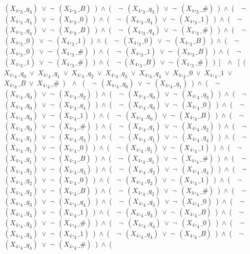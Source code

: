 ﻿\documentclass[a4paper,10pt]{article}
\begin{document}
$(X_4,_3\_q_3)$\ $\vee$\ $\neg$\ $(X_4,_3\_B)$\ )\ $\wedge$\ (\ \ $\neg$\ $(X_4,_3\_q_3)$\ $\vee$\ $\neg$\ $(X_4,_3\_\#)$\ )\ $\wedge$\ (\ \ $\neg$\ $(X_4,_3\_q_4)$\ $\vee$\ $\neg$\ $(X_4,_3\_0)$\ )\ $\wedge$\ (\ \ $\neg$\ $(X_4,_3\_q_4)$\ $\vee$\ $\neg$\ $(X_4,_3\_1)$\ )\ $\wedge$\ (\ \ $\neg$\ $(X_4,_3\_q_4)$\ $\vee$\ $\neg$\ $(X_4,_3\_B)$\ )\ $\wedge$\ (\ \ $\neg$\ $(X_4,_3\_q_4)$\ $\vee$\ $\neg$\ $(X_4,_3\_\#)$\ )\ $\wedge$\ (\ \ $\neg$\ $(X_4,_3\_0)$\ $\vee$\ $\neg$\ $(X_4,_3\_1)$\ )\ $\wedge$\ (\ \ $\neg$\ $(X_4,_3\_0)$\ $\vee$\ $\neg$\ $(X_4,_3\_B)$\ )\ $\wedge$\ (\ \ $\neg$\ $(X_4,_3\_0)$\ $\vee$\ $\neg$\ $(X_4,_3\_\#)$\ )\ $\wedge$\ (\ \ $\neg$\ $(X_4,_3\_1)$\ $\vee$\ $\neg$\ $(X_4,_3\_B)$\ )\ $\wedge$\ (\ \ $\neg$\ $(X_4,_3\_1)$\ $\vee$\ $\neg$\ $(X_4,_3\_\#)$\ )\ $\wedge$\ (\ \ $\neg$ $(X_4,_3\_B)$\ $\vee$\ $\neg$ $(X_4,_3\_\#)$\ )\ ]\ \ $\wedge$ \ [\ (\ $X_4,_4\_q_0$\ $\vee$\ $X_4,_4\_q_1$\ $\vee$\ $X_4,_4\_q_2$\ $\vee$\ $X_4,_4\_q_3$\ $\vee$\ $X_4,_4\_q_4$\ $\vee$\ $X_4,_4\_0$\ $\vee$\ $X_4,_4\_1$\ $\vee$\ $X_4,_4\_B$\ $\vee$\ $X_4,_4\_\#$\ )\ \ $\wedge$ \ (\ \ $\neg$\ $(X_4,_4\_q_0)$\ $\vee$\ $\neg$\ $(X_4,_4\_q_1)$\ )\ $\wedge$\ (\ \ $\neg$\ $(X_4,_4\_q_0)$\ $\vee$\ $\neg$\ $(X_4,_4\_q_2)$\ )\ $\wedge$\ (\ \ $\neg$\ $(X_4,_4\_q_0)$\ $\vee$\ $\neg$\ $(X_4,_4\_q_3)$\ )\ $\wedge$\ (\ \ $\neg$\ $(X_4,_4\_q_0)$\ $\vee$\ $\neg$\ $(X_4,_4\_q_4)$\ )\ $\wedge$\ (\ \ $\neg$\ $(X_4,_4\_q_0)$\ $\vee$\ $\neg$\ $(X_4,_4\_0)$\ )\ $\wedge$\ (\ \ $\neg$\ $(X_4,_4\_q_0)$\ $\vee$\ $\neg$\ $(X_4,_4\_1)$\ )\ $\wedge$\ (\ \ $\neg$\ $(X_4,_4\_q_0)$\ $\vee$\ $\neg$\ $(X_4,_4\_B)$\ )\ $\wedge$\ (\ \ $\neg$\ $(X_4,_4\_q_0)$\ $\vee$\ $\neg$\ $(X_4,_4\_\#)$\ )\ $\wedge$\ (\ \ $\neg$\ $(X_4,_4\_q_1)$\ $\vee$\ $\neg$\ $(X_4,_4\_q_2)$\ )\ $\wedge$\ (\ \ $\neg$\ $(X_4,_4\_q_1)$\ $\vee$\ $\neg$\ $(X_4,_4\_q_3)$\ )\ $\wedge$\ (\ \ $\neg$\ $(X_4,_4\_q_1)$\ $\vee$\ $\neg$\ $(X_4,_4\_q_4)$\ )\ $\wedge$\ (\ \ $\neg$\ $(X_4,_4\_q_1)$\ $\vee$\ $\neg$\ $(X_4,_4\_0)$\ )\ $\wedge$\ (\ \ $\neg$\ $(X_4,_4\_q_1)$\ $\vee$\ $\neg$\ $(X_4,_4\_1)$\ )\ $\wedge$\ (\ \ $\neg$\ $(X_4,_4\_q_1)$\ $\vee$\ $\neg$\ $(X_4,_4\_B)$\ )\ $\wedge$\ (\ \ $\neg$\ $(X_4,_4\_q_1)$\ $\vee$\ $\neg$\ $(X_4,_4\_\#)$\ )\ $\wedge$\ (\ \ $\neg$\ $(X_4,_4\_q_2)$\ $\vee$\ $\neg$\ $(X_4,_4\_q_3)$\ )\ $\wedge$\ (\ \ $\neg$\ $(X_4,_4\_q_2)$\ $\vee$\ $\neg$\ $(X_4,_4\_q_4)$\ )\ $\wedge$\ (\ \ $\neg$\ $(X_4,_4\_q_2)$\ $\vee$\ $\neg$\ $(X_4,_4\_0)$\ )\ $\wedge$\ (\ \ $\neg$\ $(X_4,_4\_q_2)$\ $\vee$\ $\neg$\ $(X_4,_4\_1)$\ )\ $\wedge$\ (\ \ $\neg$\ $(X_4,_4\_q_2)$\ $\vee$\ $\neg$\ $(X_4,_4\_B)$\ )\ $\wedge$\ (\ \ $\neg$\ $(X_4,_4\_q_2)$\ $\vee$\ $\neg$\ $(X_4,_4\_\#)$\ )\ $\wedge$\ (\ \ $\neg$\ $(X_4,_4\_q_3)$\ $\vee$\ $\neg$\ $(X_4,_4\_q_4)$\ )\ $\wedge$\ (\ \ $\neg$\ $(X_4,_4\_q_3)$\ $\vee$\ $\neg$\ $(X_4,_4\_0)$\ )\ $\wedge$\ (\ \ $\neg$\ $(X_4,_4\_q_3)$\ $\vee$\ $\neg$\ $(X_4,_4\_1)$\ )\ $\wedge$\ (\ \ $\neg$\ $(X_4,_4\_q_3)$\ $\vee$\ $\neg$\ $(X_4,_4\_B)$\ )\ $\wedge$\ (\ \ $\neg$\ $(X_4,_4\_q_3)$\ $\vee$\ $\neg$\ $(X_4,_4\_\#)$\ )\ $\wedge$\ (\ \ $\neg$\ $(X_4,_4\_q_4)$\ $\vee$\ $\neg$\ $(X_4,_4\_0)$\ )\ $\wedge$\ (\ \ $\neg$\ $(X_4,_4\_q_4)$\ $\vee$\ $\neg$\ $(X_4,_4\_1)$\ )\ $\wedge$\ (\ \ $\neg$\ $(X_4,_4\_q_4)$\ $\vee$\ $\neg$\ $(X_4,_4\_B)$\ )\ $\wedge$\ (\ \ $\neg$\ $(X_4,_4\_q_4)$\ $\vee$\ $\neg$\ $(X_4,_4\_\#)$\ )\ $\wedge$\ (\ \ 
\end{document}
